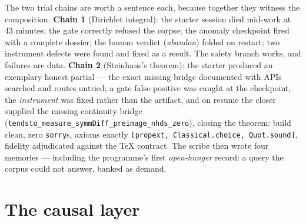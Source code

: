 \documentclass[11pt]{article}
\begin{document}
\medskip
The two trial chains are worth a sentence each, because together they
witness the composition. \textbf{Chain 1} (Dirichlet integral): the
starter session died mid-work at 43 minutes; the gate correctly
refused the corpse; the anomaly checkpoint fired with a complete
dossier; the human verdict (\emph{abandon}) folded on restart; two
instrument defects were found and fixed as a result. The safety
branch works, and failures are data. \textbf{Chain 2} (Steinhaus's
theorem): the starter produced an exemplary honest partial --- the
exact missing bridge documented with APIs searched and routes
untried; a gate false-positive was caught at the checkpoint, the
\emph{instrument} was fixed rather than the artifact, and on resume
the closer supplied the missing continuity bridge
(\texttt{tendsto\_measure\_symmDiff\_preimage\_nhds\_zero}), closing
the theorem: build clean, zero \texttt{sorry}s, axioms exactly
\texttt{[propext, Classical.choice, Quot.sound]}, fidelity
adjudicated against the TeX contract. The scribe then wrote four
memories --- including the programme's first \emph{open-hunger}
record: a query the corpus could not answer, banked as demand.

\section{The causal layer}
\end{document}
